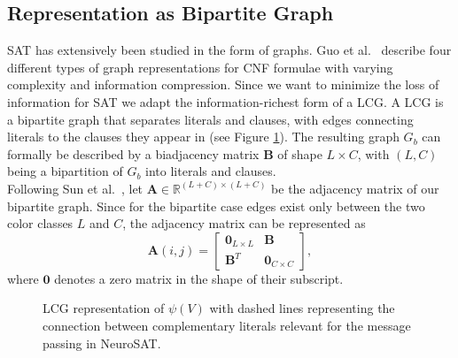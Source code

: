 \subsection{Representation as Bipartite Graph}
SAT has extensively been studied in the form of graphs. Guo et al.~\cite{guo2023machine} describe four different types of graph representations for CNF formulae with varying complexity and information compression. Since we want to minimize the loss of information for SAT we adapt the information-richest form of a \ac{LCG}. 
A LCG is a bipartite graph that separates literals and clauses, with edges connecting literals to the clauses they appear in (see Figure \ref{fig:lcg-sat}).
The resulting graph $G_b$ can formally be described by a biadjacency matrix $\mathbf{B}$ of shape $L \times C$, with $(L,C)$ being a bipartition of $G_b$ into literals and clauses. \\
Following Sun et al.~\cite{articleBiadjacency}, let $\mathbf{A} \in \mathbb{R}^{(L+C) \times (L+C)}$ be the adjacency matrix of our bipartite graph. Since for the bipartite case edges exist only between the two color classes $L$ and $C$, the adjacency matrix can be represented as
\begin{equation}
    \mathbf{A}(i,j) = \begin{bmatrix}
        \mathbf{0}_{L \times L} & \mathbf{B} \\
        \mathbf{B}^T & \mathbf{0}_{C \times C}
    \end{bmatrix},
\end{equation}
where $\mathbf{0}$ denotes a zero matrix in the shape of their subscript. \bigskip

\begin{figure}[h]
    \centering
    \caption[Bipartite graph in LCG]{LCG representation of $\psi(V)$ with dashed lines representing the connection between complementary literals relevant for the message passing in NeuroSAT.}
    \label{fig:lcg-sat}
\end{figure}


